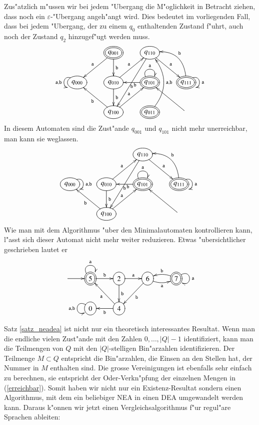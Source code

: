 Zus"atzlich m"ussen wir bei jedem "Ubergang die M"oglichkeit in
Betracht ziehen, dass noch ein $\varepsilon$-"Ubergang angeh"angt
wird. Dies bedeutet im vorliegenden Fall, dass bei jedem "Ubergang,
der zu einem $q_0$ enthaltenden Zustand f"uhrt, auch noch der
Zustand $q_2$ hinzugef"ugt werden muss.
\[
\entrymodifiers={++[o][F]}
\xymatrix{
*+\txt{}
	&*++[o][F=]{q_{001}} \ar[d]^{\tt b}\ar[dl]_{\tt a}
		&{q_{110}}\ar[dr]^{\tt a} \ar[ddl]^{\tt b}
\\
{q_{000}}\ar@(ul,dl)_{{\tt a},{\tt b}}
	&{q_{010}} \ar[ur]^{\tt a} \ar[d]^{\tt b}
		&*++[o][F=]{q_{101}} \ar@(ul,ur)^{\tt a} \ar[l]^{\tt b}
			&*++[o][F=]{q_{111}}\ar@(ur,dr)^{{\tt a}} \ar@/_20pt/[ul]_{\tt b}
\\
*+\txt{}
	&{q_{100}}\ar[ur]^{\tt a} \ar[ul]^{\tt b}
		&*++[o][F=]{q_{011}} \ar@/_20pt/[uu]_{{\tt a},{\tt b}}
			&*+\txt{}\ar[ul]
}
\]
In diesem Automaten sind die Zust"ande $q_{001}$ und $q_{101}$ nicht
mehr unerreichbar, man kann sie weglassen.
\[
\entrymodifiers={++[o][F]}
\xymatrix{
*+\txt{}
	&*+\txt{}
		&{q_{110}}\ar[dr]^{\tt a} \ar[ddl]^{\tt b}
\\
{q_{000}}\ar@(ur,dr)^{{\tt a},{\tt b}}
	&{q_{010}} \ar[ur]^{\tt a} \ar[d]^{\tt b}
		&*++[o][F=]{q_{101}} \ar@(ul,ur)^{\tt a} \ar[l]^{\tt b}
			&*++[o][F=]{q_{111}}\ar@(ur,dr)^{{\tt a}} \ar@/_20pt/[ul]_{\tt b}
\\
*+\txt{}
	&{q_{100}}\ar[ur]^{\tt a} \ar[ul]^{\tt b}
		&*+\txt{}
			&*+\txt{}\ar[ul]
}
\]
Wie man mit dem Algorithmus "uber den Minimalautomaten kontrollieren
kann, l"asst sich dieser Automat nicht mehr weiter reduzieren. Etwas
"ubersichtlicher geschrieben lautet er
\[
\entrymodifiers={++[o][F]}
\xymatrix{
*+\txt{}\ar[r]
	&*++[o][F=]{5}\ar@(ul,ur)^{\tt a} \ar[r]^{\tt b}
		&2\ar[r]^{\tt a} \ar[d]^{\tt b}
			&6\ar@/_/[r]_{\tt a} \ar[dl]^{\tt b}
				&*++[o][F=]{7}\ar@/_/[l]_{\tt b} \ar@(ur,dr)^{\tt a}
\\
*+\txt{}
	&0\ar@(ul,dl)_{{\tt a},{\tt b}}
		&4\ar[ul]^{\tt a} \ar[l]^{\tt b}
}
\]


Satz \ref{satz_neadea} ist nicht nur ein theoretisch interessantes
Resultat. Wenn man die endliche vielen Zust"ande mit den Zahlen
$0,\dots,|Q|-1$ identifiziert, kann man die Teilmengen von $Q$ mit
den $|Q|$-stelligen Bin"arzahlen identifizieren.
Der Teilmenge $M\subset Q$ entspricht die Bin"arzahlen, die Einsen an
den Stellen hat, der Nummer
in $M$ enthalten sind.
Die grosse Vereinigungen ist ebenfalls sehr einfach
zu berechnen, sie entspricht der Oder-Verkn"pfung
der einzelnen Mengen in (\ref{erreichbar}).
Somit haben wir nicht nur ein Existenz-Resultat sondern einen
Algorithmus, mit dem ein beliebiger NEA in einen DEA umgewandelt
werden kann.
Daraus k"onnen wir jetzt einen Vergleichsalgorithmus f"ur regul"are
Sprachen ableiten: 

